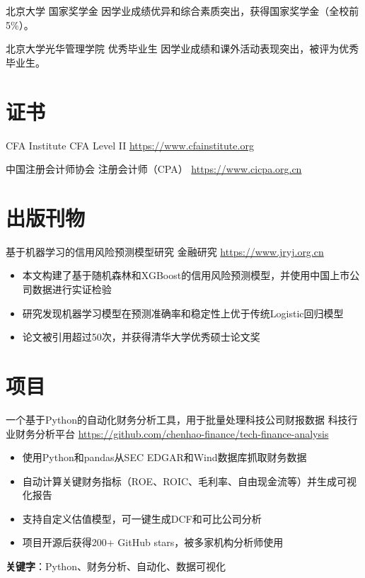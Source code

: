 \documentclass[a4paper, serif, 10pt]{moderncv}
\begin{document}
        {北京大学}
        {国家奖学金}
        {}
        {}
        {因学业成绩优异和综合素质突出，获得国家奖学金（全校前5\%）。}

        {北京大学光华管理学院}
        {优秀毕业生}
        {}
        {}
        {因学业成绩和课外活动表现突出，被评为优秀毕业生。}
\section{证书}

        {CFA Institute}
        {CFA Level II}
        {\url{https://www.cfainstitute.org}}
        {}
        {}

        {中国注册会计师协会}
        {注册会计师（CPA）}
        {\url{https://www.cicpa.org.cn}}
        {}
        {}
\section{出版刊物}

        {基于机器学习的信用风险预测模型研究}
        {金融研究}
        {\url{https://www.jryj.org.cn}}
        {}
        {\begin{itemize}
\item 本文构建了基于随机森林和XGBoost的信用风险预测模型，并使用中国上市公司数据进行实证检验
\item 研究发现机器学习模型在预测准确率和稳定性上优于传统Logistic回归模型
\item 论文被引用超过50次，并获得清华大学优秀硕士论文奖
\end{itemize}}
\section{项目}

        {一个基于Python的自动化财务分析工具，用于批量处理科技公司财报数据}
        {科技行业财务分析平台}
        {\url{https://github.com/chenhao-finance/tech-finance-analysis}}
        {}
        {\begin{itemize}
\item 使用Python和pandas从SEC EDGAR和Wind数据库抓取财务数据
\item 自动计算关键财务指标（ROE、ROIC、毛利率、自由现金流等）并生成可视化报告
\item 支持自定义估值模型，可一键生成DCF和可比公司分析
\item 项目开源后获得200+ GitHub stars，被多家机构分析师使用
\end{itemize}
\textbf{关键字}：Python、财务分析、自动化、数据可视化}
\end{document}
